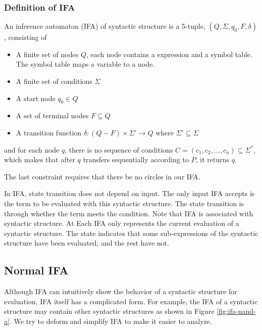 \subsubsection{Definition of IFA}

\begin{Def}

An inference automaton (IFA) of syntactic structure  is a 5-tuple, $(Q, \Sigma, q_0, F, \delta)$, consisting of

\begin{itemize}
    \item A finite set of nodes $Q$, each node contains a expression and a symbol table. The symbol table maps a variable to a node.
    \item A finite set of conditions $\Sigma$
    \item A start node $q_0 \in Q$
    \item A set of terminal nodes $F \subseteq Q$ 
    \item A transition function $\delta: (Q-F) \times \Sigma' \to Q$ where $\Sigma' \subseteq \Sigma$
\end{itemize}

and for each node $q$, there is no sequence of conditions $C = (c_1,c_2,\ldots,c_n)\subseteq \Sigma^*$, which makes that after $q$ transfers sequentially according to $P$, it returns $q$.

\end{Def}

The last constraint requires that there be no circles in our IFA.

In IFA, state transition does not depend on input. The only input IFA accepts is the term to be evaluated with this syntactic structure. The state transition is through whether the term meets the condition. Note that IFA is associated with syntactic structure. At Each IFA only represents the current evaluation of a syntactic structure. The state indicates that some sub-expressions of the syntactic structure have been evaluated, and the rest have not.

\subsection{Normal IFA}

Although IFA can intuitively show the behavior of a syntactic structure for evaluation, IFA itself has a complicated form. For example, the IFA of a syntactic structure may contain other syntactic structures as shown in Figure \ref{fig:ifa-nand-a}. We try to deform and simplify IFA to make it easier to analyze.

